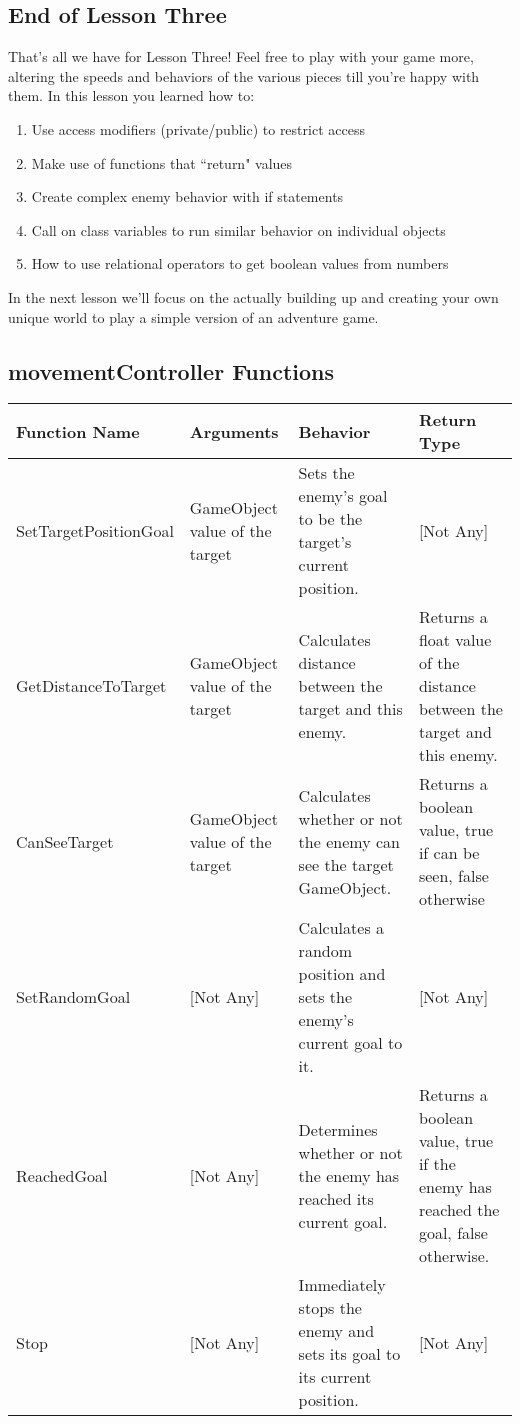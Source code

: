 \documentclass{article}
\begin{document}
\subsection{End of Lesson Three}

That's all we have for Lesson Three! Feel free to play with your game more, altering the speeds and behaviors of the various pieces till you're happy with them. In this lesson you learned how to:

\begin{enumerate}
 \item Use access modifiers (private/public) to restrict access
 \item Make use of functions that ``return" values
 \item Create complex enemy behavior with if statements
 \item Call on class variables to run similar behavior on individual objects 
 \item How to use relational operators to get boolean values from numbers
\end{enumerate}

In the next lesson we'll focus on the actually building up and creating your own unique world to play a simple version of an adventure game.

\subsection{movementController Functions}

\begin{center}
\begin{tabular}{ | m{3.3cm} | m{2.2cm} | m{4cm} | m{4cm} | } 
 \hline
 Function Name & Arguments & Behavior & Return Type \\ 
  \hline
 SetTargetPositionGoal &GameObject value of the target & Sets the enemy's goal to be the target's current position. & [Not Any] \\ 
 \hline
  GetDistanceToTarget &GameObject value of the target & Calculates distance between the target and this enemy. & Returns a float value of the distance between the target and this enemy.\\ 
  \hline
  CanSeeTarget & GameObject value of the target & Calculates whether or not the enemy can see the target GameObject. & Returns a boolean value, true if can be seen, false otherwise\\
 \hline
  SetRandomGoal & [Not Any] & Calculates a random position and sets the enemy's current goal to it. & [Not Any]\\ 
 \hline
  ReachedGoal & [Not Any] & Determines whether or not the enemy has reached its current goal. & Returns a boolean value, true if the enemy has reached the goal, false otherwise. \\ 
 \hline
 Stop & [Not Any] & Immediately stops the enemy and sets its goal to its current position.  & [Not Any] \\ 
 \hline
\end{tabular}
\end{center}
\end{document}
